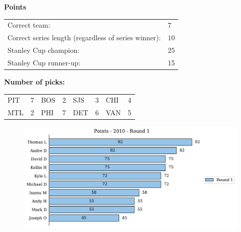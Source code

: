 \documentclass[10pt]{article}
\begin{document}
{\bf Points}\\
\begin{minipage}{12cm}
    \begin{tabular}{l l}
        Correct team:	& $7$\\
        Correct series length (regardless of series winner):	& $10$\\
        Stanley Cup champion:	& 25\\
        Stanley Cup runner-up:	& 15\\
    \end{tabular}

    \vspace{0.5cm}
    {\bf Number of picks:}\\
    \begin{tabular}{lc | lc | lc | lc }
        PIT & 7 & BOS & 2 & SJS & 3 & CHI & 4 \\
        MTL & 2 & PHI & 7 & DET & 6 & VAN & 5 \\
    \end{tabular}
\end{minipage}
\begin{minipage}[t]{13cm}
    \begin{figure}[H]
        \vspace{-3.5cm}
        \includegraphics[width=12cm]{../../figures/2010/Points-2010-Round1.pdf}
    \end{figure}
\end{minipage}
\end{document}
